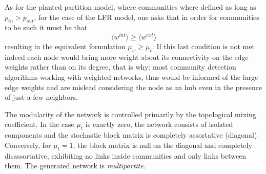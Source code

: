 As for the planted partition model, where communities where defined as long as $p_{in}>p_{out}$, for the case of the LFR model, one asks that in order for communities to be such it must be that
\begin{equation}
\langle  w^{int} \rangle \geq \langle  w^{ext} \rangle 
\end{equation}
resulting in the equivalent formulation $\mu_w  \geq \mu_t$.
If this last condition is not met indeed each node would bring more weight about its connectivity on the edge weights rather than on its degree, that is why: most community detection algorithms working with weighted networks, thus would be informed of the large edge weights and are mislead considering the node as an hub even in the presence of just a few neighbors.

The modularity of the network is controlled primarily by the topological mixing coefficient.
In the case $\mu_t$ is exactly zero, the network consists of isolated components and the stochastic block matrix is completely assortative (diagonal).
Conversely, for $\mu_t=1$, the block matrix is null on the diagonal and completely disassortative, exhibiting no links inside communities and only links between them.
The generated network is \emph{multipartite}.

